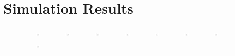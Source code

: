 \documentclass{article}
\begin{document}
\section*{Simulation Results}
\begin{figure}[htbp]
  \centering
  \begin{tabular}{ccccccc}
    \includegraphics[width=0.2\textwidth]{assets/deform_0000.png} & 
    \includegraphics[width=0.2\textwidth]{assets/deform_0050.png} & 
    \includegraphics[width=0.2\textwidth]{assets/deform_0100.png} &
    \includegraphics[width=0.2\textwidth]{assets/deform_0150.png} & 
    \includegraphics[width=0.2\textwidth]{assets/deform_0200.png} & 
    \includegraphics[width=0.2\textwidth]{assets/deform_0250.png} &
    \includegraphics[width=0.2\textwidth]{assets/deform_0300.png} \\ 
    \includegraphics[width=0.2\textwidth]{assets/deform_0350.png} & 

\end{tabular}
\end{figure}
\end{document}
